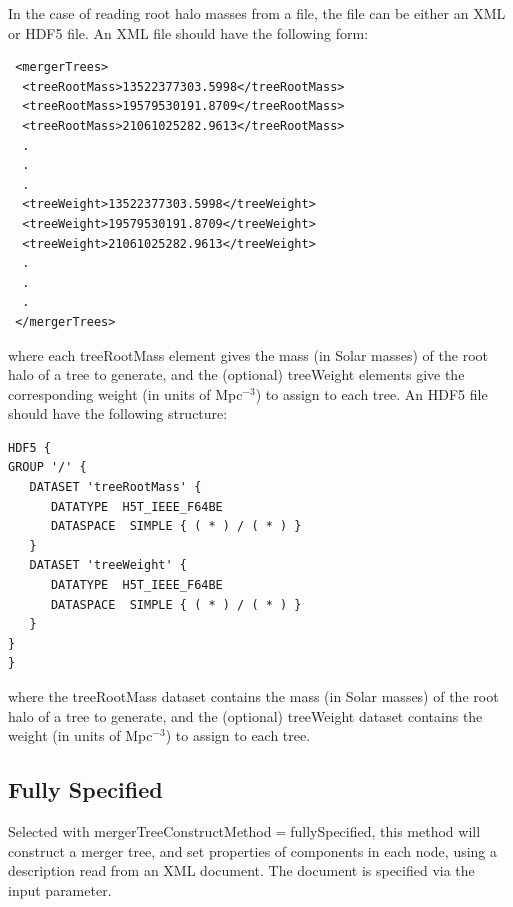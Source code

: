 In the case of reading root halo masses from a file, the file can be either an XML or HDF5 file. An XML file should have the following form:
\begin{verbatim}
 <mergerTrees>
  <treeRootMass>13522377303.5998</treeRootMass>
  <treeRootMass>19579530191.8709</treeRootMass>
  <treeRootMass>21061025282.9613</treeRootMass>
  .
  .
  .
  <treeWeight>13522377303.5998</treeWeight>
  <treeWeight>19579530191.8709</treeWeight>
  <treeWeight>21061025282.9613</treeWeight>
  .
  .
  .
 </mergerTrees>
\end{verbatim}
where each {\normalfont \ttfamily treeRootMass} element gives the mass (in Solar masses) of the root halo of a tree to generate, and the (optional) {\normalfont \ttfamily treeWeight} elements give the corresponding weight (in units of Mpc$^{-3}$) to assign to each tree. An HDF5 file should have the following structure:
\begin{verbatim}
HDF5 {
GROUP '/' {
   DATASET 'treeRootMass' {
      DATATYPE  H5T_IEEE_F64BE
      DATASPACE  SIMPLE { ( * ) / ( * ) }
   }
   DATASET 'treeWeight' {
      DATATYPE  H5T_IEEE_F64BE
      DATASPACE  SIMPLE { ( * ) / ( * ) }
   }
}
}
\end{verbatim}
where the {\normalfont \ttfamily treeRootMass} dataset contains the mass (in Solar masses) of the root halo of a tree to generate, and the (optional) {\normalfont \ttfamily treeWeight} dataset contains the weight (in units of Mpc$^{-3}$) to assign to each tree.

\subsection{Fully Specified}\label{sec:TreeConstructFullySpecified}

Selected with {\normalfont \ttfamily mergerTreeConstructMethod}$=${\normalfont \ttfamily fullySpecified}, this method will construct a merger tree, and set properties of components in each node, using a description read from an XML document. The document is specified via the {\normalfont \ttfamily [mergerTreeConstructFullySpecifiedFileName]} input parameter.


